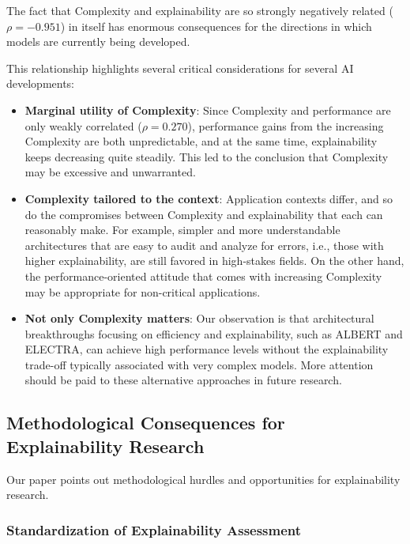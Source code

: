 \documentclass[preprint,12pt]{elsarticle}
\begin{document}
The fact that Complexity and explainability are so strongly negatively related ($\rho = -0.951$) in itself has enormous consequences for the directions in which models are currently being developed.

This relationship highlights several critical considerations for several AI developments:

\begin{itemize}
   \item \textbf{Marginal utility of Complexity}: Since Complexity and performance are only weakly correlated ($\rho = 0.270$), performance gains from the increasing Complexity are both unpredictable, and at the same time, explainability keeps decreasing quite steadily. This led to the conclusion that Complexity may be excessive and unwarranted.
   
   \item \textbf{Complexity tailored to the context}: Application contexts differ, and so do the compromises between Complexity and explainability that each can reasonably make. For example, simpler and more understandable architectures that are easy to audit and analyze for errors, i.e., those with higher explainability, are still favored in high-stakes fields. On the other hand, the performance-oriented attitude that comes with increasing Complexity may be appropriate for non-critical applications.
   
   \item \textbf{Not only Complexity matters}: Our observation is that architectural breakthroughs focusing on efficiency and explainability, such as ALBERT and ELECTRA, can achieve high performance levels without the explainability trade-off typically associated with very complex models. More attention should be paid to these alternative approaches in future research.
\end{itemize}

\subsection{Methodological Consequences for Explainability Research}

Our paper points out methodological hurdles and opportunities for explainability research.

\subsubsection{Standardization of Explainability Assessment}
\end{document}
